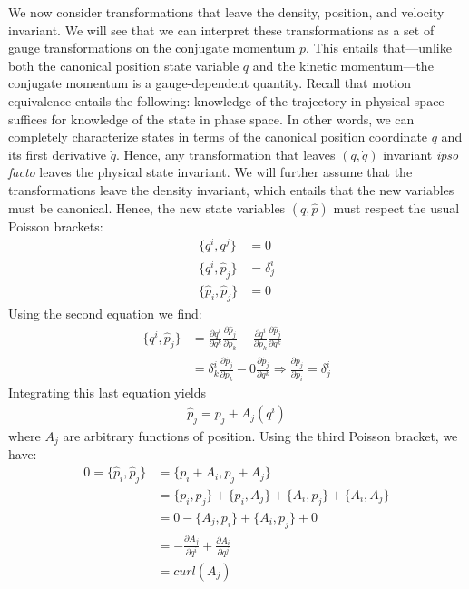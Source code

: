 \documentclass[letterpaper]{article}
\begin{document}
We now consider transformations that leave the density, position, and velocity invariant. We will see that we can interpret these transformations as a set of gauge transformations on the conjugate momentum $p $. This entails that---unlike both the canonical position state variable $q$ and the kinetic momentum---the conjugate momentum is a gauge-dependent quantity. Recall that motion equivalence entails the following: knowledge of the trajectory in physical space suffices for knowledge of the state in phase space. In other words, we can completely characterize states in terms of the canonical position coordinate $q$ and its first derivative $\dot{q}$. Hence, any transformation that leaves $(q,\dot{q}) $ invariant \textit{ipso facto} leaves the physical state invariant. We will further assume that the transformations leave the density invariant, which entails that the new variables must be canonical. Hence, the new state variables $(q, \hat{p})$ must respect the usual Poisson brackets:
\begin{equation}
\begin{aligned}
	\{q^i, q^j\} &= 0 \\
	\{q^i, \hat{p}_j\} &= \delta^i_j \\
	\{\hat{p}_i, \hat{p}_j\} &= 0
\end{aligned}
\end{equation}
Using the second equation we find:
\begin{equation}
\begin{aligned}
	\{q^i, \hat{p}_j\} &= \frac{\partial q^i}{\partial q^k} \frac{\partial \hat{p}_j}{\partial p_k} - \frac{\partial q^i}{\partial p_k} \frac{\partial \hat{p}_j}{\partial q^k} \\
	&= \delta^i_k \frac{\partial \hat{p}_j}{\partial p_k} - 0 \frac{\partial \hat{p}_j}{\partial q^k} \Rightarrow \frac{\partial \hat{p}_j}{\partial p_i} = \delta^i_j
\end{aligned}
\end{equation}
Integrating this last equation yields
\begin{equation}
\begin{aligned}
\hat{p}_j = p_j + A_j(q^i)
\end{aligned}
\end{equation}
where $A_j$ are arbitrary functions of position. Using the third Poisson bracket, we have:
\begin{equation}
\begin{aligned}
0 = \{\hat{p}_i, \hat{p}_j\} &= \{p_i + A_i, p_j + A_j\} \\
&= \{p_i, p_j \} + \{p_i , A_j\} + \{A_i, p_j \} + \{A_i, A_j\} \\
&= 0 - \{A_j, p_i\} + \{A_i, p_j \} + 0 \\
&= - \frac{\partial A_j}{\partial q^i} + \frac{\partial A_i}{\partial q^j} \\
&= curl(A_j) \\
\end{aligned}
\end{equation}
\end{document}
